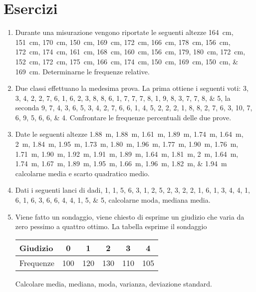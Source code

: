 \chapter{Esercizi}
%
\begin{enumerate}
	\item Durante una misurazione vengono riportate le seguenti altezze \SIlist{164; 151; 170;  150; 169; 172; 166; 178; 156; 172; 174; 161; 168; 160; 156; 179,
	180; 172; 152; 172; 175; 166; 174; 150; 169; 150; 169}{\cm}. Determinarne  le frequenze relative.
\item Due classi effettuano la medesima prova. La prima ottiene i seguenti voti: \numlist{3; 3; 4; 2; 2; 7; 6; 1; 6; 2; 3; 8; 8; 6; 1; 7; 7; 7; 8; 1; 9; 8; 3; 7; 7; 8; 5}, la seconda \numlist{9; 7; 4; 3; 6; 5; 3; 4; 2; 7; 6; 6; 1; 4; 5; 2; 2; 2; 1; 8; 8; 2; 7; 6; 3; 10; 7; 6; 9;
	5; 6; 6; 4}. Confrontare le frequenze percentuali delle due prove.
\item Date le seguenti altezze \SIlist{1.88; 1.88; 1.61; 1.89; 1.74; 1.64; 2; 1.84; 1.95; 1.73; 1.80; 1.96; 1.77; 1.90; 1.76; 1.71; 1.90;
	1.92; 1.91; 1.89; 1.64; 1.81; 2; 1.64; 1.74; 1.67; 1.89; 1.95; 1.66; 1.96; 1.82; 1.94}{\m} calcolarne media e scarto quadratico medio.
\item Dati i seguenti lanci di dadi, \numlist{1; 1; 5; 6; 3; 1; 2; 5; 2; 3; 2; 2; 1; 6; 1; 3; 4; 4; 1; 6; 1; 6; 3; 6; 6; 4; 4; 1; 5; 5}, calcolarne moda, mediana media.
\item Viene fatto un sondaggio, viene chiesto di esprime un giudizio che varia da zero pessimo a quattro  ottimo. La tabella esprime il sondaggio
\begin{center}
	\begin{tabular}{l*{5} {S[table-format=3.0]}}
		{Giudizio}	&0  &1  &2  &3&4  \\
		\midrule 
		{Frequenze}	& 100 &120  & 130 & 110&105 \\ 
	\end{tabular}
\end{center} Calcolare media, mediana, moda, varianza, deviazione standard.
\end{enumerate}